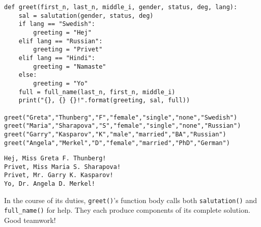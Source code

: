 \begin{Verbatim}[fontsize=\footnotesize,samepage=true,frame=single,framesep=3mm]
def greet(first_n, last_n, middle_i, gender, status, deg, lang):
    sal = salutation(gender, status, deg)
    if lang == "Swedish":
        greeting = "Hej"
    elif lang == "Russian":
        greeting = "Privet"
    elif lang == "Hindi":
        greeting = "Namaste"
    else:
        greeting = "Yo"
    full = full_name(last_n, first_n, middle_i)
    print("{}, {} {}!".format(greeting, sal, full))

greet("Greta","Thunberg","F","female","single","none","Swedish")
greet("Maria","Sharapova","S","female","single","none","Russian")
greet("Garry","Kasparov","K","male","married","BA","Russian")
greet("Angela","Merkel","D","female","married","PhD","German")
\end{Verbatim}
\vspace{-.2in}

\begin{Verbatim}[fontsize=\small,samepage=true,frame=leftline,framesep=5mm,framerule=1mm]
Hej, Miss Greta F. Thunberg!
Privet, Miss Maria S. Sharapova!
Privet, Mr. Garry K. Kasparov!
Yo, Dr. Angela D. Merkel!
\end{Verbatim}

In the course of its duties, \texttt{greet()}'s function body calls both
\texttt{salutation()} and \texttt{full\_name()} for help. They each produce
components of its complete solution. Good teamwork!


